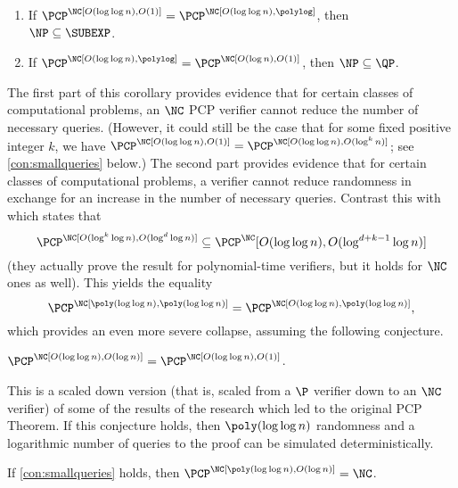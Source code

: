 \begin{corollary}
  \mbox{}
  \begin{enumerate}
  \item If $\PCP^\NC[O(\loglog n), O(1)] = \PCP^\NC[O(\loglog n), \polylog]$, then \\ $\NP \subseteq \SUBEXP$.
  \item If $\PCP^\NC[O(\loglog n), \polylog] = \PCP^\NC[O(\log n), O(1)]$, then $\NP \subseteq \QP$.
  \end{enumerate}
\end{corollary}

The first part of this corollary provides evidence that for certain classes of computational problems, an $\NC$ PCP verifier cannot reduce the number of necessary queries.
(However, it could still be the case that for some fixed positive integer $k$, we have $\PCP^\NC[O(\loglog n), O(1)] = \PCP^\NC[O(\loglog n), O(\log^k n)]$; see \autoref{con:smallqueries} below.)
The second part provides evidence that for certain classes of computational problems, a verifier cannot reduce randomness in exchange for an increase in the number of necessary queries.
Contrast this with \autocite[Corollary~10]{fs96} which states that
\begin{equation*}
  \PCP^\NC[O(\log^k \log n), O(\log^d \log n)] \subseteq \PCP^\NC[O(\loglog n), O(\log^{d + k - 1} \log n)]
\end{equation*}
(they actually prove the result for polynomial-time verifiers, but it holds for $\NC$ ones as well).
This yields the equality
\begin{equation*}
  \PCP^\NC[\poly(\loglog n), \poly(\loglog n)] = \PCP^\NC[O(\loglog n), \poly(\loglog n)],
\end{equation*}
which provides an even more severe collapse, assuming the following conjecture.
\begin{conjecture}\label{con:smallqueries}
  $\PCP^\NC[O(\loglog n), O(\log n)] = \PCP^\NC[O(\loglog n), O(1)]$.
\end{conjecture}
This is a scaled down version (that is, scaled from a $\P$ verifier down to an $\NC$ verifier) of some of the results of the research which led to the original PCP Theorem.
If this conjecture holds, then $\poly(\loglog n)$ randomness and a logarithmic number of queries to the proof can be simulated deterministically.
\begin{theorem}
  If \autoref{con:smallqueries} holds, then $\PCP^\NC[\poly(\loglog n), O(\log n)] = \NC$.
\end{theorem}
